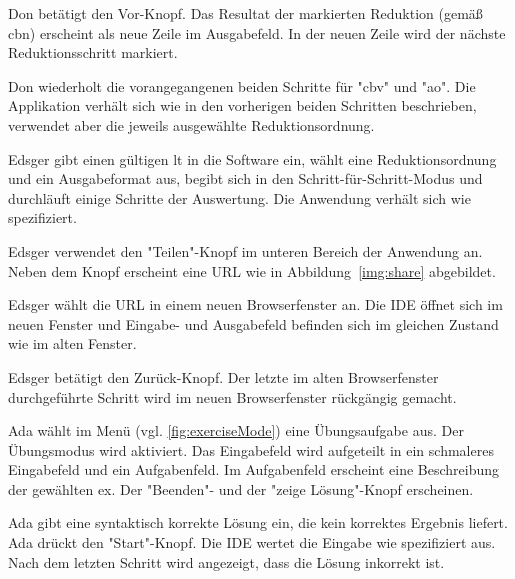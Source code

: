 \documentclass[parskip=full,11pt,twoside]{scrartcl}
\begin{document}
{Don betätigt den Vor-Knopf.}
{Das Resultat der markierten Reduktion (gemäß \gls{cbn}) erscheint als neue Zeile im Ausgabefeld.
In der neuen Zeile wird der nächste Reduktionsschritt markiert.}

{Don wiederholt die vorangegangenen beiden Schritte für "\gls{cbv}" und "\gls{ao}".}
{Die Applikation verhält sich wie in den vorherigen beiden Schritten beschrieben,
verwendet aber die jeweils ausgewählte Reduktionsordnung.}


{Edsger gibt einen gültigen \gls{lt} in die Software ein, wählt eine Reduktionsordnung und ein
Ausgabeformat aus, begibt sich in den Schritt-für-Schritt-Modus und durchläuft einige
Schritte der Auswertung.}
{Die Anwendung verhält sich wie spezifiziert.}

{Edsger verwendet den "Teilen"-Knopf im unteren Bereich der Anwendung an.}
{Neben dem Knopf erscheint eine URL wie in Abbildung~\ref{img:share}
abgebildet.}

{Edsger wählt die URL in einem neuen Browserfenster an.}
{Die IDE öffnet sich im neuen Fenster und Eingabe- und Ausgabefeld befinden sich im gleichen Zustand wie im alten Fenster.}

{Edsger betätigt den Zurück-Knopf.}
{Der letzte im alten Browserfenster durchgeführte Schritt wird im neuen Browserfenster
rückgängig gemacht.}


{Ada wählt im Menü (vgl. \cref{fig:exerciseMode}) eine Übungsaufgabe aus.}
{Der Übungsmodus wird aktiviert. 
 Das Eingabefeld wird aufgeteilt in ein schmaleres Eingabefeld und ein Aufgabenfeld.
 Im Aufgabenfeld erscheint eine Beschreibung der gewählten \gls{ex}.
 Der "Beenden"- und der "zeige Lösung"-Knopf erscheinen.}

{Ada gibt eine syntaktisch korrekte Lösung ein, die kein korrektes Ergebnis liefert.
 Ada drückt den "Start"-Knopf.}
{Die IDE wertet die Eingabe wie spezifiziert aus.
 Nach dem letzten Schritt wird angezeigt, dass die Lösung inkorrekt ist.}
\end{document}
